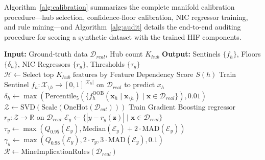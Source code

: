Algorithm~\ref{alg:calibration} summarizes the complete manifold calibration procedure---hub selection, confidence-floor calibration, NIC regressor training, and rule mining---and Algorithm~\ref{alg:audit} details the end-to-end auditing procedure for scoring a synthetic dataset with the trained HIF components.

\begin{algorithm}[ht]
\caption{HIF Manifold Calibration}
\label{alg:calibration}
\begin{algorithmic}[1]
\Statex \textbf{Input:} Ground-truth data $\mathcal{D}_{real}$, Hub count $K_{hub}$
\Statex \textbf{Output:} Sentinels $\{f_h\}$, Floors $\{\delta_h\}$, NIC Regressors $\{r_y\}$, Thresholds $\{\tau_y\}$
\State $\mathcal{H} \leftarrow \text{Select top } K_{hub} \text{ features by Feature Dependency Score } S(h)$
    \State Train Sentinel $f_h: \mathcal{X}_{\setminus h} \to [0, 1]^{|\mathcal{X}_h|}$ on $\mathcal{D}_{real}$ to predict $x_h$
    \State $\delta_h \leftarrow \max( \text{Percentile}_{5} ( \{ f_h^{\text{OOB}}(\mathbf{x}_h \mid \mathbf{x}_{\setminus h}) \mid \mathbf{x} \in \mathcal{D}_{real} \} ), 0.01)$
\EndFor
\State $\mathcal{Z} \leftarrow \text{SVD}(\text{Scale}(\text{OneHot}(\mathcal{D}_{cat})))$ 
    \State Train Gradient Boosting regressor $r_y: \mathcal{Z} \to \mathbb{R}$ on $\mathcal{D}_{real}$
    \State $\mathcal{E}_y \leftarrow \{ |y - r_y(\mathbf{z})| \mid \mathbf{x} \in \mathcal{D}_{real} \}$ 
    \State $\tau_y \leftarrow \max(Q_{0.95}(\mathcal{E}_y), \text{Median}(\mathcal{E}_y) + 2 \cdot \text{MAD}(\mathcal{E}_y))$ 
    \State $\gamma_y \leftarrow \max(Q_{0.98}(\mathcal{E}_y), 2 \cdot \tau_y, 3 \cdot \text{MAD}(\mathcal{E}_y), 0.1)$ 
\EndFor
\State $\mathcal{R} \leftarrow \text{MineImplicationRules}(\mathcal{D}_{real})$ 
\end{algorithmic}
\end{algorithm}

